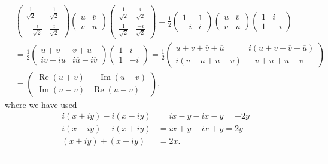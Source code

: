 \documentclass[aps, preprint]{revtex4}
\begin{document}
\begin{align} & \left (\begin{array}{cc}\frac{1}{\sqrt{2}} & \frac{1}{\sqrt{2}} \\
 -\frac{i}{\sqrt{2}} & \frac{i}{\sqrt{2}}\end{array}\right ) \left (\begin{array}{cc}u & \overline{v} \\
v & \overline{u}\end{array}\right ) \left (\begin{array}{cc}\frac{1}{\sqrt{2}} & \frac{i}{\sqrt{2}} \\
\frac{1}{\sqrt{2}} & \frac{ -i}{\sqrt{2}}\end{array}\right ) =\frac{1}{2} \left (\begin{array}{cc}1 & 1 \\
 -i & i\end{array}\right ) \left (\begin{array}{cc}u & \overline{v} \\
v & \overline{u}\end{array}\right ) \left (\begin{array}{cc}1 & i \\
1 &  -i\end{array}\right ) \\
 &  =\frac{1}{2} \left (\begin{array}{cc}u +v & \overline{v} +\overline{u} \\
i v -i u & i \overline{u} -i \overline{v}\end{array}\right ) \left (\begin{array}{cc}1 & i \\
1 &  -i\end{array}\right ) =\frac{1}{2} \left (\begin{array}{cc}u +v +\overline{v} +\overline{u} & i \left (u +v -\overline{v} -\overline{u}\right ) \\
i \left (v -u +\overline{u} -\overline{v}\right ) &  -v +u +\overline{u} -\overline{v}\end{array}\right ) \\
 &  =\left (\begin{array}{cc}\ensuremath{\operatorname*{Re}} \left (u +v\right ) &  -\ensuremath{\operatorname*{Im}} \left (u +v\right ) \\
\ensuremath{\operatorname*{Im}} \left (u -v\right ) & \ensuremath{\operatorname*{Re}} \left (u -v\right )\end{array}\right )\text{,}\end{align}where we have used
\begin{align}i \left (x +i y\right ) -i \left (x -i y\right ) &  =i x -y -i x -y = -2 y \\
i \left (x -i y\right ) -i \left (x +i y\right ) &  =i x +y -i x +y =2 y \\
\left (x +i y\right ) +\left (x -i y\right ) &  =2 x\text{.}\end{align}$\rfloor $ 
\end{document}
